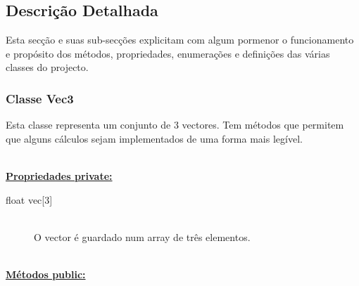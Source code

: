 \documentclass[a5paper,onecolumn, 11pt]{article}
\begin{document}
\clearpage
\subsection{Descrição Detalhada}
Esta secção e suas sub-secções explicitam com algum pormenor o funcionamento e propósito dos métodos, propriedades, enumerações e definições das várias classes do projecto.

\subsubsection{Classe Vec3} \label{classe vec3}
Esta classe representa um conjunto de 3 vectores. Tem métodos que permitem que alguns cálculos sejam implementados de uma forma mais legível.

\hfill \\ \underline{\textbf{Propriedades private:}}

\begin{description}
	\item[float vec{[3]}] \hfill \\
	O vector é guardado num array de três elementos.
\end{description}

\hfill \\ \underline{\textbf{Métodos public:}}
\end{document}
